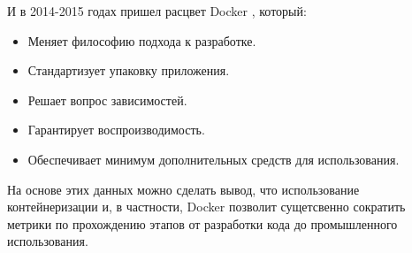 \begin{enumerate}
        И в 2014-2015 годах пришел расцвет Docker \cite{демидова2019использование}, который:
        \begin{itemize}
            \item Меняет философию подхода к разработке.
            \item Стандартизует упаковку приложения.
            \item Решает вопрос зависимостей.
            \item Гарантирует воспроизводимость.
            \item Обеспечивает минимум дополнительных средств для использования.
        \end{itemize}
\end{enumerate}

На основе этих данных можно сделать вывод, что использование контейнеризации и, в частности, Docker позволит сущетсвенно сократить метрики по прохождению этапов от разработки кода до промышленного использования.
